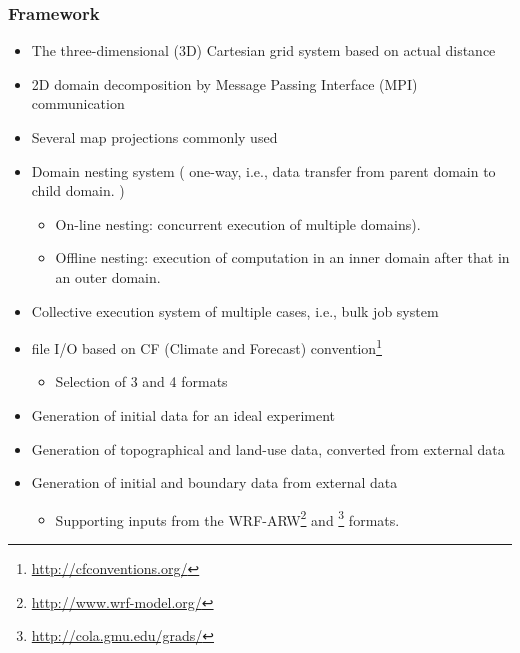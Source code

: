 \subsubsection{Framework}
\begin{itemize}
 \item The three-dimensional (3D) Cartesian grid system based on actual distance
 \item 2D domain decomposition by Message Passing Interface (MPI) communication
 \item Several map projections commonly used
 \item Domain nesting system ( one-way, i.e., data transfer from parent domain to child domain. )
   \begin{itemize}
    \item  On-line nesting: concurrent execution of multiple domains).
    \item  Offline nesting: execution of computation in an inner domain after that in an outer domain.
   \end{itemize}
 \item Collective execution system of multiple cases, i.e., bulk job system
 \item \netcdf file I/O based on CF (Climate and Forecast) convention\footnote{\url{http://cfconventions.org/}}
   \begin{itemize}
   \item Selection of {\netcdf}3 and {\netcdf}4 formats
   \end{itemize}
 \item Generation of initial data for an ideal experiment
 \item Generation of topographical and land-use data, converted from external data
 \item Generation of initial and boundary data from external data
   \begin{itemize}
    \item 
      Supporting inputs from the WRF-ARW\footnote{\url{http://www.wrf-model.org/}} and
      \grads \footnote{\url{http://cola.gmu.edu/grads/}} formats.
   \end{itemize}
\end{itemize}

